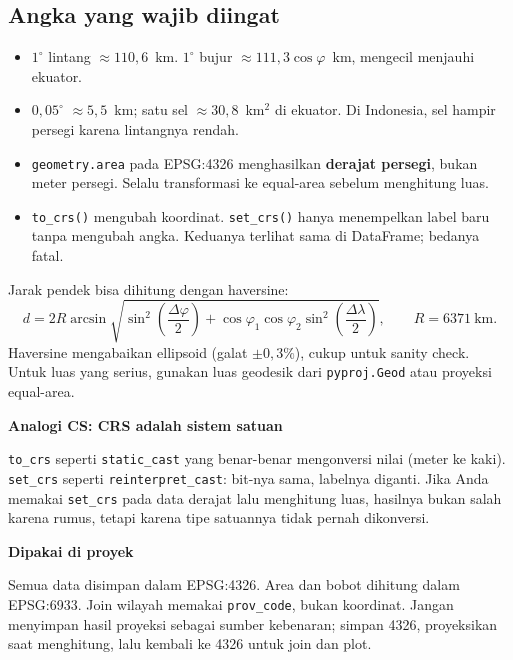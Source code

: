 \documentclass[9pt,a4paper]{extarticle}
\newcommand{\code}[1]{\texttt{\small\color{ink}#1}}
\newcommand{\prov}{\code{prov\_code}}
\newenvironment{csbox}[1]
  {\begin{tcolorbox}[enhanced,breakable,colback=tealbg,colframe=tealbg,boxrule=0pt,arc=1.1mm,
    left=3mm,right=2.2mm,top=1.4mm,bottom=1.4mm,borderline west={2.2pt}{0pt}{accent},
    before skip=3pt,after skip=3pt]
   \textcolor{accent}{\sffamily\bfseries #1}\par\vspace{0.5pt}}
  {\end{tcolorbox}}
\newenvironment{projectbox}[1]
  {\begin{tcolorbox}[enhanced,breakable,colback=bg,colframe=bg,boxrule=0pt,arc=1.1mm,
    left=3mm,right=2.2mm,top=1.4mm,bottom=1.4mm,borderline west={2.2pt}{0pt}{ink},
    before skip=3pt,after skip=3pt]
   \textcolor{ink}{\sffamily\bfseries #1}\par\vspace{0.5pt}}
  {\end{tcolorbox}}
\begin{document}
\subsection{Angka yang wajib diingat}

\begin{itemize}[leftmargin=1.2em,itemsep=0.4pt,topsep=1pt]
  \item $1^\circ$ lintang $\approx 110{,}6$~km. $1^\circ$ bujur $\approx 111{,}3\cos\varphi$~km, mengecil menjauhi ekuator.
  \item $0{,}05^\circ$ $\approx 5{,}5$~km; satu sel $\approx 30{,}8$~km$^2$ di ekuator. Di Indonesia, sel hampir persegi karena lintangnya rendah.
  \item \code{geometry.area} pada EPSG:4326 menghasilkan \textbf{derajat persegi}, bukan meter persegi. Selalu transformasi ke equal-area sebelum menghitung luas.
  \item \code{to\_crs()} mengubah koordinat. \code{set\_crs()} hanya menempelkan label baru tanpa mengubah angka. Keduanya terlihat sama di DataFrame; bedanya fatal.
\end{itemize}

Jarak pendek bisa dihitung dengan haversine:
\[
d = 2R\arcsin\sqrt{\sin^2\!\left(\frac{\Delta\varphi}{2}\right)
+ \cos\varphi_1\cos\varphi_2\sin^2\!\left(\frac{\Delta\lambda}{2}\right)},
\qquad R = 6371~\text{km}.
\]
Haversine mengabaikan ellipsoid (galat $\pm0{,}3\%$), cukup untuk sanity check. Untuk luas yang serius, gunakan luas geodesik dari \code{pyproj.Geod} atau proyeksi equal-area.

\begin{csbox}{Analogi CS: CRS adalah sistem satuan}
\code{to\_crs} seperti \code{static\_cast} yang benar-benar mengonversi nilai (meter ke kaki). \code{set\_crs} seperti \code{reinterpret\_cast}: bit-nya sama, labelnya diganti. Jika Anda memakai \code{set\_crs} pada data derajat lalu menghitung luas, hasilnya bukan salah karena rumus, tetapi karena tipe satuannya tidak pernah dikonversi.
\end{csbox}

\begin{projectbox}{Dipakai di proyek}
Semua data disimpan dalam EPSG:4326. Area dan bobot dihitung dalam EPSG:6933. Join wilayah memakai \prov, bukan koordinat. Jangan menyimpan hasil proyeksi sebagai sumber kebenaran; simpan 4326, proyeksikan saat menghitung, lalu kembali ke 4326 untuk join dan plot.
\end{projectbox}
\end{document}
